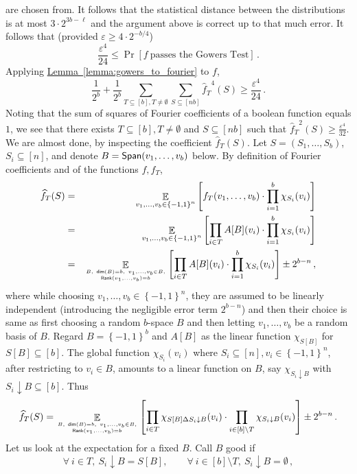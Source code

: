 \documentclass[11pt]{article}
\numberwithin{equation}{section}
\theoremstyle{definition}
\theoremstyle{plain}
\newcommand{\expref}[2]{\hyperref[#2]{#1~\ref{#2}}}
\newcommand\set[1]{{\left\{ #1 \right\}}}
\newcommand\Prob[2]{{\Pr_{#1}\left[ {#2} \right]}}
\newcommand\Expect[2]{{\mathop{\mathbb{E}}_{#1}\left[ {#2} \right]}}
\newcommand\cube[1]{ { \set{-1,1}^{#1} } }
\newcommand\eps{\varepsilon}
\renewcommand\geq{\geqslant}
\renewcommand\leq{\leqslant}
\begin{document}
are chosen from. It follows that the statistical distance between the distributions is at most $3\cdot 2^{3b-\ell}$ and the argument
above is correct up to that much error. It follows that (provided $\eps \geq 4\cdot 2^{-b/4}$)
 $$  \frac{\eps^4}{24} \leq \Prob{}{f ~\mbox{passes the Gowers Test}}\,. $$%
Applying \expref{Lemma}{lemma:gowers_to_fourier} to $f$,
 $$ \frac{1}{2^b} + \frac{1}{2^b} \sum\limits_{T\subseteq [b], T \neq \emptyset}{\sum\limits_{S \subseteq [nb]}{{\widehat{f}_T}^4(S)}}
 \geq  \frac{\eps^4}{24}\,. $$%
Noting that the sum of squares of Fourier coefficients of a boolean function equals $1$, we see that there exists $T \subseteq [b],
T \neq \emptyset$ and $S \subseteq [nb]$ such that
${\widehat{f}_T}^2(S)  \geq \frac{\eps^4}{32}$. We are almost done, by inspecting the coefficient  $\widehat{f}_T(S)$. Let $S = (S_1,\ldots, S_b)$,
$S_i \subseteq [n]$, and  denote $B = {\sf Span}(v_1,\ldots,v_b)$  below.
 By definition of Fourier coefficients and of the functions $f, f_T$,
\begin{eqnarray*}
   \widehat{f}_T(S) & = & \Expect{v_1,\ldots,v_b \in \cube{n}}{ f_T(v_1,\ldots,v_b) \cdot \prod_{i=1}^b \chi_{S_i}(v_i) } \\
    & = &  \Expect{v_1,\ldots,v_b \in \cube{n}}{ \prod_{i\in T} A[B](v_i)  \cdot \prod_{i=1}^b \chi_{S_i}(v_i) } \\
    & = & \Expect{B, ~{\sf dim}(B)=b, ~v_1,\ldots, v_b \in B,  \atop{{\sf Rank}(v_1,\ldots,v_b)=b}  }{ \prod_{i\in T} A[B](v_i)  \cdot \prod_{i=1}^b \chi_{S_i}(v_i)}
     \pm 2^{b-n}\,,%
\end{eqnarray*}
where while choosing $v_1,\ldots,v_b \in \cube{n}$, they are assumed to be linearly independent (introducing the negligible error term $2^{b-n}$) and then
their choice is same as first choosing a random $b$-space $B$ and then letting  $v_1,\ldots,v_b$ be a random basis of $B$. Regard $B = \cube{b}$ and $A[B]$ as
the linear function $\chi_{S[B]}$ for $S[B] \subseteq [b]$. The global function $\chi_{S_i} (v_i)$ where $S_i \subseteq [n], v_i \in \cube{n}$, after restricting
to $v_i \in B$, amounts to a linear function on $B$, say $\chi_{S_i \downarrow B}$ with  $S_i \downarrow B \subseteq [b]$. Thus
$$
   \widehat{f}_T(S)  =  \Expect{B, ~{\sf dim}(B)=b, ~v_1,\ldots, v_b \in B,  \atop{{\sf Rank}(v_1,\ldots,v_b)=b}  }
                                 { \prod_{i\in T}  \chi_{S[B] \Delta S_i\downarrow B} (v_i)   \cdot \prod_{i\in [b]\setminus T}  \chi_{S_i\downarrow B}(v_i)}
     \pm 2^{b-n}\,.%
$$
Let us look at the expectation for a fixed $B$. Call $B$ good if
\begin{equation}  \label{eqn:good-B}
 \forall  ~i\in T,  \  S_i\downarrow B = S[B], \quad \quad \forall ~i\in [b]\setminus T, \  S_i\downarrow B=\emptyset\,,%
\end{equation}
\end{document}
